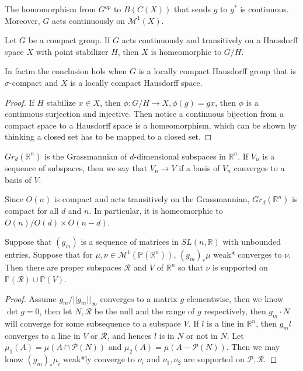 \documentclass[lang=en, color=blue, ]{elegantbook}
\newcommand{\R}{\mathbb{R}}
\newcommand{\M}{\mathcal{M}}
\begin{document}
\begin{lemma}
    The homomorphism from $G^{op}$ to $B(C(X))$ that sends $g$ to $g^*$ is continuous. Moreover, $G$ acts continuously on $\M^1(X)$.
\end{lemma}

\begin{lemma}
    Let $G$ be a compact group. If $G$ acts continuously and transitively on a Hausdorff space $X$ with point stabilizer $H$, then $X$ is homeomorphic to $G/H$.\par
    In factm the conclusion hols when $G$ is a locally compact Hausdorff group that is $\sigma$-compact and $X$ is a locally compact Hausdorff space.
\end{lemma}

\begin{proof}\par
    If $H$ stabilize $x\in X$, then $\phi:G/H\to X, \phi(g) = gx$, then $\phi$ is a continuous surjection and injective. Then notice a continuous bijection from a compact space to a Hausdorff space is a homeomorphism, which can be shown by thinking a closed set has to be mapped to a closed set.
\end{proof}

\begin{definition}
    $Gr_d(\R^n)$ is the Grassmannian of $d$-dimensional subspaces in $\R^n$. If $V_n$ is a sequence of subspaces, then we say that $V_n\to V$ if a basis of $V_n$ converges to a basis of $V$.
\end{definition}

\begin{corollary}
    Since $O(n)$ is compact and acts transitively on the Grassmannian, $Gr_d(\R^n)$ is compact for all $d$ and $n$. In particular, it is homeomorphic to $O(n)/O(d)\times O(n-d)$.
\end{corollary}

\begin{lemma}
    Suppose that $(g_m)$ is a sequence of matrices in $SL(n,\R)$ with unbounded entries. Suppose that for $\mu,\nu \in \M^1(\mathbb{P}(\R^n))$, $(g_m)_*\mu$ weak* converges to $\nu$. Then there are proper subspaces $\mathcal{R}$ and $V$ of $\R^n$ so that $\nu$ is supported on $\mathbb{P}(\mathcal{R})\cup \mathbb{P}(V)$.
\end{lemma}

\begin{proof}
    Assume $g_m/||g_m||_{\infty}$ converges to a matrix $g$ elementwise, then we know $\det g = 0$, then let $N,\mathcal{R}$ be the null and the range of $g$ respectively, then $g_m\cdot N$ will converge for some subsequence to a subspace $V$. If $l$ is a line in $\R^n$, then $g_m l$ converges to a line in $V$ or $\mathcal{R}$, and hences $l$ is in $N$ or not in $N$. Let $\mu_1(A) = \mu(A\cap \mathcal{P}(N))$ and $\mu_2(A) = \mu(A- \mathcal{P}(N))$. Then we may know $(g_m)_*\mu_i$ weak*ly converge to $\nu_i$ and $\nu_1,\nu_2$ are supported on $\mathcal{P}, \mathcal{R}$. 
\end{proof}

\newpage

\begin{definition}
    
\end{definition}
\end{document}
